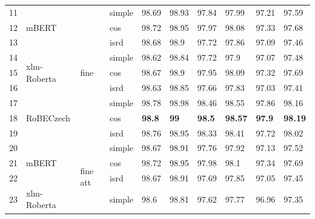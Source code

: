 \begin{table}[!h]
{\begin{tabular}{|l|l|l|l||llllll|}
11 & \multirow{3}{*}{mBERT} & \multirow{9}{*}{fine} & simple & 98.69 & 98.93 & 97.84 & 97.99 & 97.21 & 97.59 \\ \cline{1-1} \cline{4-10}
12 &                              &                         & cos    & 98.72  & 98.95   & 97.97   & 98.08    & 97.33     & 97.68      \\ \cline{1-1} \cline{4-10}
13 &                              &                         & isrd   & 98.68  & 98.9    & 97.72   & 97.86    & 97.09     & 97.46      \\ \cline{1-2} \cline{4-10}
14 & \multirow{3}{*}{xlm-Roberta} &                         & simple & 98.62  & 98.84   & 97.72   & 97.9     & 97.07     & 97.48      \\ \cline{1-1} \cline{4-10}
15 &                              &                         & cos    & 98.67  & 98.9    & 97.95   & 98.09    & 97.32     & 97.69      \\ \cline{1-1} \cline{4-10}
16 &                              &                         & isrd   & 98.63  & 98.85   & 97.66   & 97.83    & 97.03     & 97.41      \\ \cline{1-2} \cline{4-10}
17 & \multirow{3}{*}{RoBECzech}   &                         & simple & 98.78  & 98.98   & 98.46   & 98.55    & 97.86     & 98.16      \\ \cline{1-1} \cline{4-10}
18 &                              &                         & cos    & \textbf{98.8}   & \textbf{99 }     & \textbf{98.5}    & \textbf{98.57}    & \textbf{97.9 }     & \textbf{98.19 }     \\ \cline{1-1} \cline{4-10}
19 &                              &                         & isrd   & 98.76  & 98.95   & 98.33   & 98.41    & 97.72     & 98.02      \\ \cline{1-2} \cline{4-10} \hline
20 & \multirow{3}{*}{mBERT}       &      \multirow{9}{*}{fine att}                    & simple & 98.67  & 98.91   & 97.76   & 97.92    & 97.13     & 97.52      \\ \cline{1-1} \cline{4-10}
21 &                              &                         & cos    & 98.72  & 98.95   & 97.98   & 98.1     & 97.34     & 97.69      \\ \cline{1-1} \cline{4-10}
22 &                              &                         & isrd   & 98.67  & 98.91   & 97.69   & 97.85    & 97.05     & 97.45      \\ \cline{1-2} \cline{4-10}
23 & \multirow{3}{*}{xlm-Roberta} &                         & simple & 98.6   & 98.81   & 97.62   & 97.77    & 96.96     & 97.35      \\ \cline{1-1} \cline{4-10}

\end{tabular}}
\end{table}
